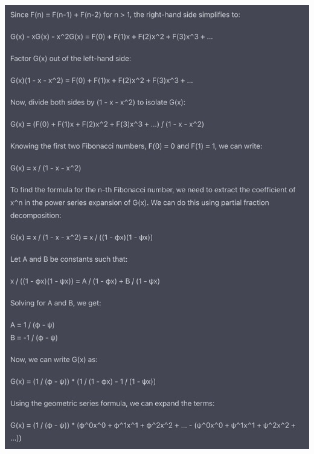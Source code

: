\begin{mdframed}
\includegraphics[width=400pt]{img/linear-algebra--vector-spaces-and-fields--computing-the-n-th-fibonacci-number-generating-function-535e.png}
\end{mdframed}

